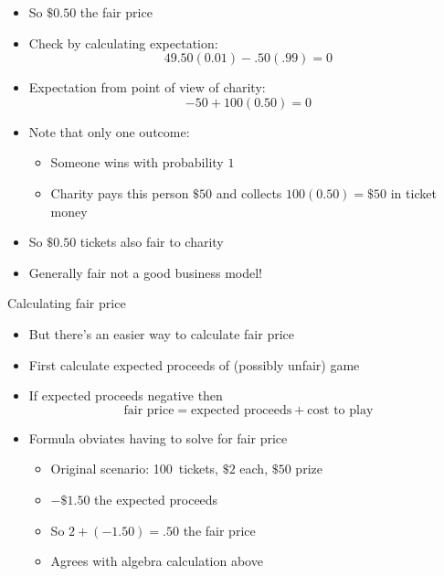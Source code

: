\begin{frame}
\begin{itemize}
\item So $\$0.50$ the fair price
\item Check by calculating expectation:
\[49.50\left(0.01\right)-.50\left(.99\right)=0\]
\item Expectation from point of view of charity:
\[-50+100\left(0.50\right)=0\]
\item Note that only one outcome:
\begin{itemize}
\item Someone wins with probability $1$
\item Charity pays this person $\$50$ and collects $100\left(0.50\right)
=\$50$ in ticket money
\end{itemize}
\item So $\$0.50$ tickets also \alert{fair} to charity
\item Generally \alert{fair} not a good business model!
\end{itemize}
\end{frame}

\begin{frame}{Calculating fair price}
\begin{itemize}
\item But there's an easier way to calculate fair price
\item First calculate expected proceeds of (possibly unfair) game
\item If expected proceeds \alert{negative} then
\[\text{fair price}=\text{expected proceeds}+\text{cost to play}\]
\item Formula obviates having to solve for fair price
\begin{example}
\begin{itemize}
\item Original scenario: 100~tickets, $\$2$ each, $\$50$ prize
\item $-\$1.50$ the expected proceeds
\item So $2+\left(-1.50\right)=.50$ the fair price
\item Agrees with algebra calculation above
\end{itemize}
\end{example}
\end{itemize}
\end{frame}

